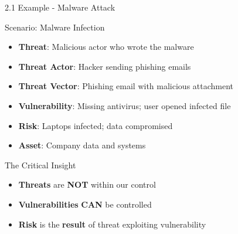 \documentclass[9pt]{beamer}  %
\begin{document}
	\begin{frame}{2.1 Example - Malware Attack}
		\begin{block}{Scenario: Malware Infection}
			\begin{itemize}
				\item \textbf{Threat}: Malicious actor who wrote the malware
				\item \textbf{Threat Actor}: Hacker sending phishing emails
				\item \textbf{Threat Vector}: Phishing email with malicious attachment
				\item \textbf{Vulnerability}: Missing antivirus; user opened infected file
				\item \textbf{Risk}: Laptops infected; data compromised
				\item \textbf{Asset}: Company data and systems
			\end{itemize}
		\end{block}
		
		\begin{alertblock}{The Critical Insight}
			\begin{itemize}
				\item \textbf{Threats} are \textbf{NOT} within our control
				\item \textbf{Vulnerabilities} \textbf{CAN} be controlled
				\item \textbf{Risk} is the \textbf{result} of threat exploiting vulnerability
			\end{itemize}
		\end{alertblock}
	\end{frame}
	
\end{document}
